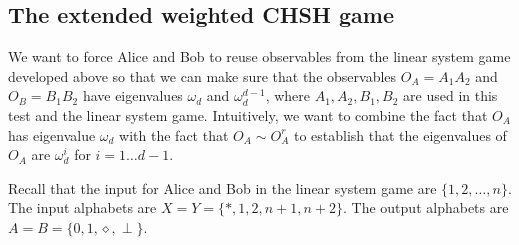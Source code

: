 \documentclass[11pt,letterpaper]{article}
\newcommand{\1}{\mathbb{1}}
\theoremstyle{definition}
\begin{document}
\subsection{The extended weighted CHSH game}
We want to force Alice and Bob to reuse observables 
from the linear system game developed above so that we can make sure that the observables 
$O_A = A_1A_2$ and $O_B =B_1B_2$ have eigenvalues $\omega_d$ and $\omega_d^{d-1}$,
where $A_1,A_2,B_1,B_2$ are used in this test and the linear system game.
Intuitively, we want to combine the fact that $O_A$ has eigenvalue $\omega_d$ with the fact that 
$O_A \sim O_A^r$ to establish that
the eigenvalues of $O_A$ are $\omega_d^i$ for $i =1 \dots d-1$.

Recall that the input for Alice and Bob in the linear system game are $\{1,2,\dots,n\}$.
The input alphabets are $X = Y = \{\ast, 1, 2, n+1,n+2\}$.
The output alphabets are $A = B = \{0, 1, \diamond, \perp\}$.
\end{document}
